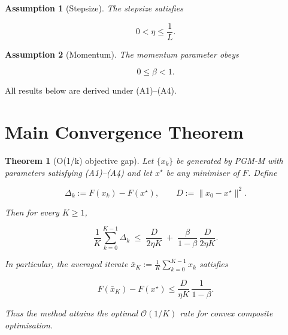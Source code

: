 \documentclass{article}
\newtheorem{theorem}{Theorem}
\newtheorem{assumption}{Assumption}
\begin{document}
\begin{assumption}[Stepsize]
The stepsize satisfies  

\[
0<\eta\le\frac{1}{L}.
\tag{A3}
\]

\end{assumption}

\begin{assumption}[Momentum]
The momentum parameter obeys  

\[
0\le\beta<1.
\tag{A4}
\]

\end{assumption}

All results below are derived under (A1)–(A4).

\section*{Main Convergence Theorem}
\begin{theorem}[O(1/k) objective gap]\label{thm:rate}
Let \(\{x_k\}\) be generated by PGM‑M with parameters satisfying (A1)–(A4) and let \(x^{\star}\) be any minimiser of \(F\). Define  

\[
\Delta_k:=F(x_k)-F(x^{\star}),\qquad
D:=\|x_0-x^{\star}\|^{2}.
\]

Then for every \(K\ge1\),

\[
\boxed{\;
\frac{1}{K}\sum_{k=0}^{K-1}\Delta_k
\;\le\;
\frac{D}{2\eta K}
\;+\;
\frac{\beta}{1-\beta}\,\frac{D}{2\eta K}.
\;}
\tag{T1}
\]

In particular, the averaged iterate  
\(\bar x_K:=\tfrac1K\sum_{k=0}^{K-1}x_k\) satisfies  

\[
F(\bar x_K)-F(x^{\star})\le \frac{D}{\eta K}\,\frac{1}{1-\beta}.
\tag{T2}
\]

Thus the method attains the optimal \(\mathcal O(1/K)\) rate for convex composite optimisation.
\end{theorem}

\end{document}
